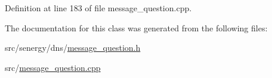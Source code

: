 Definition at line 183 of file message\-\_\-question.\-cpp.



The documentation for this class was generated from the following files\-:\begin{DoxyCompactItemize}
\item 
src/senergy/dns/\hyperlink{message__question_8h}{message\-\_\-question.\-h}\item 
src/\hyperlink{message__question_8cpp}{message\-\_\-question.\-cpp}\end{DoxyCompactItemize}
